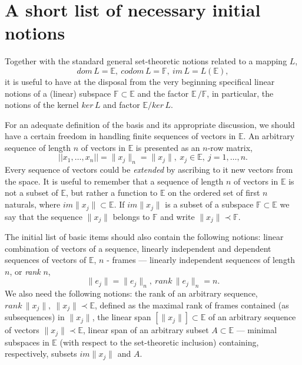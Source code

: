 \documentclass[]{amsart}
\begin{document}
  
 \section{A short list of necessary initial notions} 
 Together with the standard general set-theoretic notions related to a map\-ping $L$,
 \[
 dom\, L=\mathbb E,\  codom\, L=\mathbb F,\ im\,L= L(\mathbb E),
 \]
  it is useful to have at the disposal from the very beginning  
    {  specifical} 
   linear notions of a (linear) subspace $\mathbb F\subset\mathbb E$ and the factor $\mathbb E\,/\mathbb F$, in particular, the notions of the kernel $ker\,L$ and   factor $\mathbb E/ ker\,L$. 
 
 \noindent 
For an adequate definition of the basis 
 and its appropriate discus\-sion,  we should have a certain freedom in handling finite sequences of vectors in $\mathbb E$.  An arbitrary sequence of length $n$ of vectors in $\mathbb E$   is presented as an $n$-row matrix,
   \[
   ||x_1,\ldots,x_n||=\|x_j\|_n=\|x_j\|,\ x_j\in\mathbb E,\ j=1,\ldots,n.
   \]
 Every sequence of vectors could be \emph{extended } by ascribing to it new vectors from the space. It is useful to remember that a sequence of length $n$ of vectors in $\mathbb E$ is not a subset of $\mathbb E$, but rather a function to $\mathbb E$ on the ordered set of first $n$ naturals, where  $im \|x_j\|\subset\mathbb E$. If $im\|x_j\|$ is a subset of a subspace $\mathbb F\subset\mathbb E$ we say that the sequence $\|x_j\|$ belongs to  $\mathbb F$ and write $\|x_j\|\prec\mathbb F$.
 
 The initial list of basic items should  also contain the following notions: linear combination of vectors of a sequence, linearly independent and depen\-dent sequences of vectors of $\mathbb E$, $n$ - frames
  --- linearly independent sequences of length $n$, or \emph{rank} $n$, 
  \[
    \|e_j\|=\|e_j\|_n,\   rank\, \|e_j\|_n=n.
  \]
  We also need the following notions:
the rank of an arbitrary sequence,\break 
$rank\,\|x_j\|,\ \|x_j\| \prec\mathbb E$,  defined as the maximal   rank  of frames contained (as subsequences) in $\|x_j\|$, the linear span $[\|x_j\|]\subset\mathbb E$ of an arbitrary sequence of vectors $\|x_j\|\prec\mathbb E$, linear span of an arbitrary subset $A\subset\mathbb E$ --- minimal subspaces in $\mathbb E$ (with respect to the set-theoretic inclusion) containing, respec\-tively, subsets $im\|x_j\|$ and $A$.
 
 
\end{document}
